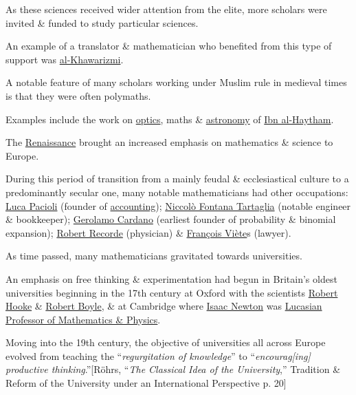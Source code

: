 \documentclass{article}
\begin{document}
As these sciences received wider attention from the elite, more scholars were invited \& funded to study particular sciences.

An example of a translator \& mathematician who benefited from this type of support was \href{https://en.wikipedia.org/wiki/Al-Khawarizmi}{al-Khawarizmi}.

A notable feature of many scholars working under Muslim rule in medieval times is that they were often polymaths.

Examples include the work on \href{https://en.wikipedia.org/wiki/Optics}{optics}, maths \& \href{https://en.wikipedia.org/wiki/Astronomy}{astronomy} of \href{https://en.wikipedia.org/wiki/Ibn_al-Haytham}{Ibn al-Haytham}.

%
The \href{https://en.wikipedia.org/wiki/Renaissance}{Renaissance} brought an increased emphasis on mathematics \& science to Europe.

During this period of transition from a mainly feudal \& ecclesiastical culture to a predominantly secular one, many notable mathematicians had other occupations: \href{https://en.wikipedia.org/wiki/Luca_Pacioli}{Luca Pacioli} (founder of \href{https://en.wikipedia.org/wiki/Accounting}{accounting}); \href{https://en.wikipedia.org/wiki/Niccol%C3%B2_Fontana_Tartaglia}{Niccolò Fontana Tartaglia} (notable engineer \& bookkeeper); \href{https://en.wikipedia.org/wiki/Gerolamo_Cardano}{Gerolamo Cardano} (earliest founder of probability \& binomial expansion); \href{https://en.wikipedia.org/wiki/Robert_Recorde}{Robert Recorde} (physician) \& \href{https://en.wikipedia.org/wiki/Fran%C3%A7ois_Vi%C3%A8te}{François Viète}s (lawyer). 

%
As time passed, many mathematicians gravitated towards universities.

An emphasis on free thinking \& experimentation had begun in Britain's oldest universities beginning in the 17th century at Oxford with the scientists \href{https://en.wikipedia.org/wiki/Robert_Hooke}{Robert Hooke} \& \href{https://en.wikipedia.org/wiki/Robert_Boyle}{Robert Boyle}, \& at Cambridge where \href{https://en.wikipedia.org/wiki/Isaac_Newton}{Isaac Newton} was \href{https://en.wikipedia.org/wiki/Lucasian_Professor_of_Mathematics}{Lucasian Professor of Mathematics \& Physics}.

Moving into the 19th century, the objective of universities all across Europe evolved from teaching the ``\textit{regurgitation of knowledge}'' to ``\textit{encourag[ing] productive thinking}.''[Röhrs, ``\textit{The Classical Idea of the University},'' Tradition \& Reform of the University under an International Perspective p. 20]
\end{document}
